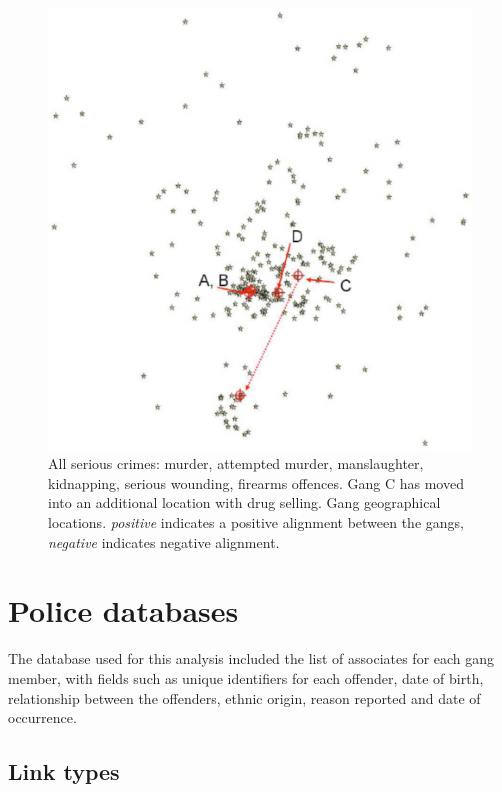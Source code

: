\documentclass[twocolumn]{svjour3}          %
\theoremstyle{definition}
\begin{document}
\begin{figure}[!ht] 
\centering
\includegraphics[width=\columnwidth]{images/serious}
\caption{All serious crimes: murder, attempted murder, manslaughter,
kidnapping, serious wounding, firearms offences. Gang C has moved into
an additional location with drug selling. Gang geographical locations. \emph{positive} indicates a positive alignment between the gangs, \emph{negative} indicates negative alignment.}
\label{fig:serious}
\end{figure}


\section{Police databases}\label{sec:policedatabases}

The database used for this analysis included the list of associates
for each gang member, with fields such as unique identifiers for each
offender, date of birth, relationship between the offenders, ethnic
origin, reason reported and date of occurrence.

\subsection{Link types}\label{sec:linktypes} 
\end{document}
